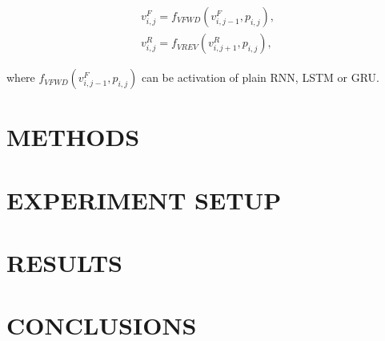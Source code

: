 \documentclass[a4paper, 10 pt, conference]{ieeeconf}
\begin{document}
\begin{gather}
	v_{i,j}^{F} = f_{VFWD} (v_{i,j-1}^F, p_{i,j}), \\
    v_{i,j}^{R} = f_{VREV} (v_{i,j+1}^R, p_{i,j}),
\end{gather}

where $f_{VFWD} (v_{i,j-1}^F, p_{i,j})$ can be activation of plain RNN, LSTM or GRU.



\section{METHODS}

\section{EXPERIMENT SETUP}

\section{RESULTS}

\section{CONCLUSIONS}





\end{document}
